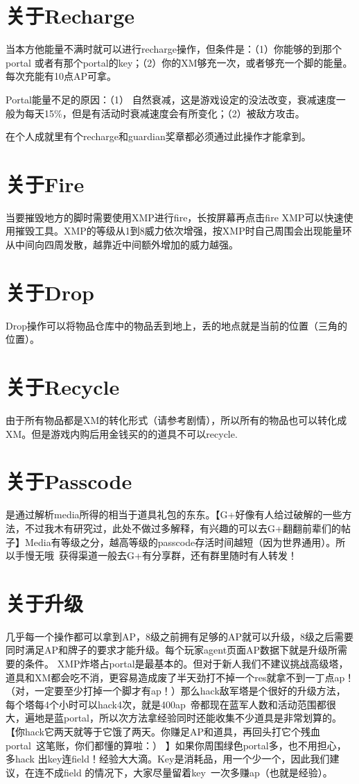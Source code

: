 \documentclass[12pt]{article}
\theoremstyle{definition}
\theoremstyle{remark}
\numberwithin{equation}{section}
\begin{document}
\section{关于Recharge}
当本方他能量不满时就可以进行recharge操作，但条件是：（1）你能够的到那个portal 或者有那个portal的key；（2）你的XM够充一次，或者够充一个脚的能量。每次充能有10点AP可拿。\par
Portal能量不足的原因：（1） 自然衰减，这是游戏设定的没法改变，衰减速度一般为每天15\%，但是有活动时衰减速度会有所变化；（2）被敌方攻击。\par
在个人成就里有个recharge和guardian奖章都必须通过此操作才能拿到。

\section{关于Fire}
当要摧毁地方的脚时需要使用XMP进行fire，长按屏幕再点击fire XMP可以快速使用摧毁工具。XMP的等级从1到8威力依次增强，按XMP时自己周围会出现能量环从中间向四周发散，越靠近中间额外增加的威力越强。

\section{关于Drop}
Drop操作可以将物品仓库中的物品丢到地上，丢的地点就是当前的位置（三角的位置）。

\section{关于Recycle}
由于所有物品都是XM的转化形式（请参考剧情），所以所有的物品也可以转化成XM。但是游戏内购后用金钱买的的道具不可以recycle.

\section{关于Passcode}
是通过解析media所得的相当于道具礼包的东东。【G+好像有人给过破解的一些方法，不过我木有研究过，此处不做过多解释，有兴趣的可以去G+翻翻前辈们的帖子】Media有等级之分，越高等级的passcode存活时间越短（因为世界通用）。所以手慢无哦~获得渠道一般去G+有分享群，还有群里随时有人转发！

\section{关于升级}
几乎每一个操作都可以拿到AP，8级之前拥有足够的AP就可以升级，8级之后需要同时满足AP和牌子的要求才能升级。每个玩家agent页面AP数据下就是升级所需要的条件。
XMP炸塔占portal是最基本的。但对于新人我们不建议挑战高级塔，道具和XM都会吃不消，更容易造成废了半天劲打不掉一个res就拿不到一丁点ap！（对，一定要至少打掉一个脚才有ap！）那么hack敌军塔是个很好的升级方法，每个塔每4个小时可以hack4次，就是400ap~帝都现在蓝军人数和活动范围都很大，遍地是蓝portal，所以次方法拿经验同时还能收集不少道具是非常划算的。【你hack它两天就等于它饿了两天。你赚足AP和道具，再回头打它个残血portal~这笔账，你们都懂的算啦：） 】如果你周围绿色portal多，也不用担心，多hack 出key连field！经验大大滴。Key是消耗品，用一个少一个，因此我们建议，在连不成field 的情况下，大家尽量留着key~一次多赚ap（也就是经验）。
\end{document}
